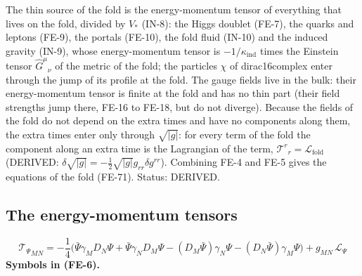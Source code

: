\documentclass[
  10pt,
]{article}
\begin{document}
The thin source of the fold is the energy-momentum tensor of everything
that lives on the fold, divided by \(V_*\) (IN-8): the Higgs doublet
(FE-7), the quarks and leptons (FE-9), the portals (FE-10), the fold
fluid (IN-10) and the induced gravity (IN-9), whose energy-momentum
tensor is \(-1/\kappa_{\mathrm{ind}}\) times the Einstein tensor
\(\hat G^\mu{}_\nu\) of the metric of the fold; the particles \(\chi\)
of dirac16complex enter through the jump of its profile at the fold. The
gauge fields live in the bulk: their energy-momentum tensor is finite at
the fold and has no thin part (their field strengths jump there, FE-16
to FE-18, but do not diverge). Because the fields of the fold do not
depend on the extra times and have no components along them, the extra
times enter only through \(\sqrt{\lvert g\rvert}\): for every term of
the fold the component along an extra time is the Lagrangian of the
term, \(\mathcal{T}^r{}_r = \mathcal{L}_{\mathrm{fold}}\) (DERIVED:
\(\delta\sqrt{\lvert g\rvert} = -\frac12\sqrt{\lvert g\rvert}g_{rr}\delta g^{rr}\)).
Combining FE-4 and FE-5 gives the equations of the fold (FE-71). Status:
DERIVED.

\hypertarget{the-energy-momentum-tensors}{%
\subsection{The energy-momentum
tensors}\label{the-energy-momentum-tensors}}

\[
{\mathcal{T}_\Psi}_{MN} = -\frac14\Big(\bar\Psi\gamma_MD_N\Psi + \bar\Psi\gamma_ND_M\Psi - (D_M\bar\Psi)\gamma_N\Psi
 - (D_N\bar\Psi)\gamma_M\Psi\Big) + g_{MN}\,\mathcal{L}_\Psi \tag{FE-6}
\] \textbf{Symbols in (FE-6).}
\end{document}

